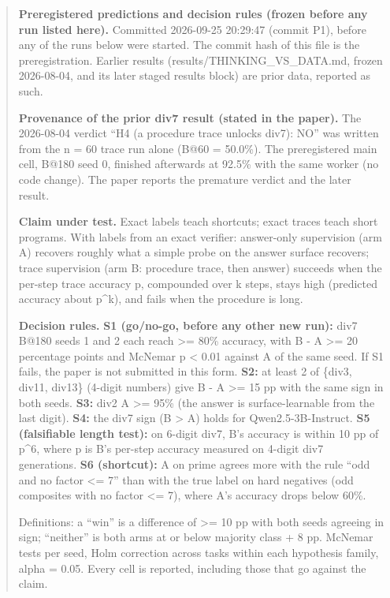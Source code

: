 \documentclass{article}
\theoremstyle{definition}
\begin{document}
\begin{small}
\begin{quote}
\textbf{Preregistered predictions and decision rules (frozen before any run listed here).} Committed 2026-09-25 20:29:47 (commit P1), before any of the runs below were started. The commit hash of this file is the preregistration. Earlier results (results/THINKING\_VS\_DATA.md, frozen 2026-08-04, and its later staged results block) are prior data, reported as such.

\textbf{Provenance of the prior div7 result (stated in the paper).} The 2026-08-04 verdict ``H4 (a procedure trace unlocks div7): NO'' was written from the n = 60 trace run alone (B@60 = 50.0\%). The preregistered main cell, B@180 seed 0, finished afterwards at 92.5\% with the same worker (no code change). The paper reports the premature verdict and the later result.

\textbf{Claim under test.} Exact labels teach shortcuts; exact traces teach short programs. With labels from an exact verifier:
answer-only supervision (arm A) recovers roughly what a simple probe on the answer surface recovers;
trace supervision (arm B: procedure trace, then answer) succeeds when the per-step trace accuracy p, compounded over k steps, stays high (predicted accuracy about p\textasciicircum k), and fails when the procedure is long.

\textbf{Decision rules.}
\textbf{S1 (go/no-go, before any other new run):} div7 B@180 seeds 1 and 2 each reach >= 80\% accuracy, with B - A >= 20 percentage points and McNemar p < 0.01 against A of the same seed. If S1 fails, the paper is not submitted in this form.
\textbf{S2:} at least 2 of \{div3, div11, div13\} (4-digit numbers) give B - A >= 15 pp with the same sign in both seeds.
\textbf{S3:} div2 A >= 95\% (the answer is surface-learnable from the last digit).
\textbf{S4:} the div7 sign (B > A) holds for Qwen2.5-3B-Instruct.
\textbf{S5 (falsifiable length test):} on 6-digit div7, B's accuracy is within 10 pp of p\textasciicircum 6, where p is B's per-step accuracy measured on 4-digit div7 generations.
\textbf{S6 (shortcut):} A on prime agrees more with the rule ``odd and no factor <= 7'' than with the true label on hard negatives (odd composites with no factor <= 7), where A's accuracy drops below 60\%.

Definitions: a ``win'' is a difference of >= 10 pp with both seeds agreeing in sign; ``neither'' is both arms at or below majority class + 8 pp. McNemar tests per seed, Holm correction across tasks within each hypothesis family, alpha = 0.05. Every cell is reported, including those that go against the claim.


\end{quote}
\end{small}
\end{document}

